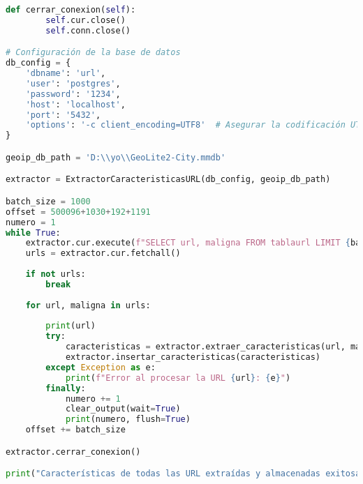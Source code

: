 \documentclass{article}
\begin{document}
\begin{lstlisting}[language=Python, caption=Clase para extraer características de URLs]
    def cerrar_conexion(self):
        self.cur.close()
        self.conn.close()

# Configuración de la base de datos
db_config = {
    'dbname': 'url',
    'user': 'postgres',
    'password': '1234',
    'host': 'localhost',
    'port': '5432',
    'options': '-c client_encoding=UTF8'  # Asegurar la codificación UTF-8
}

geoip_db_path = 'D:\\yo\\GeoLite2-City.mmdb'

extractor = ExtractorCaracteristicasURL(db_config, geoip_db_path)

batch_size = 1000
offset = 500096+1030+192+1191
numero = 1
while True:
    extractor.cur.execute(f"SELECT url, maligna FROM tablaurl LIMIT {batch_size} OFFSET {offset}")
    urls = extractor.cur.fetchall()
    
    if not urls:
        break
    
    for url, maligna in urls:
        
        print(url)
        try:
            caracteristicas = extractor.extraer_caracteristicas(url, maligna)
            extractor.insertar_caracteristicas(caracteristicas)
        except Exception as e:
            print(f"Error al procesar la URL {url}: {e}")
        finally:
            numero += 1
            clear_output(wait=True)
            print(numero, flush=True)
    offset += batch_size

extractor.cerrar_conexion()

print("Características de todas las URL extraídas y almacenadas exitosamente.")
\end{lstlisting}
\end{document}
